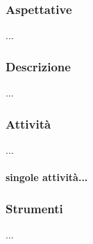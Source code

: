     \subsubsection{Aspettative}
    ...
    \subsubsection{Descrizione}
    ...
    \subsubsection{Attività}
    ...
    \paragraph{singole attività...}
    \subsubsection{Strumenti}
    ...
